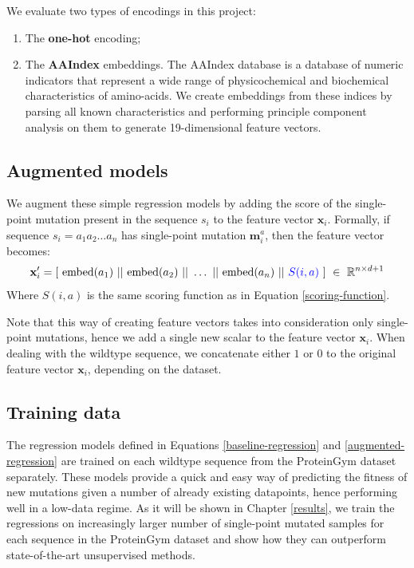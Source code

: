 We evaluate two types of encodings in this project:
\begin{enumerate}
    \item The \textbf{one-hot} encoding;
    \item The \textbf{AAIndex} embeddings. The AAIndex database \cite{aa-index} is a database of numeric indicators that represent a wide range of physicochemical and biochemical characteristics of amino-acids. We create embeddings from these indices by parsing all known characteristics and performing principle component analysis on them to generate 19-dimensional feature vectors. 
\end{enumerate}

\subsection{Augmented models} 
We augment these simple regression models by adding the score of the single-point mutation present in the sequence $s_i$ to the feature vector $\mathbf{x}_i$. Formally, if sequence $s_i = a_1a_2\dots a_n$ has single-point mutation $\mathbf{m}_i^a$, then the feature vector becomes:
\begin{equation}
    \mathbf{x}_i' = [~\text{embed}(a_1) ~||~ \text{embed}(a_2) ~||~ \dots ~||~ \text{embed}(a_n) ~||~ {\color{blue} S(i, a)}~] ~\in~\mathbb{R}^{n\times d + 1}
\label{augmented-regression}
\end{equation}
Where $S(i, a)$ is the same scoring function as in Equation \ref{scoring-function}. 

Note that this way of creating feature vectors takes into consideration only single-point mutations, hence we add a single new scalar to the feature vector $\mathbf{x}_i$. When dealing with the wildtype sequence, we concatenate either $1$ or $0$ to the original feature vector $\mathbf{x}_i$, depending on the dataset.

\subsection{Training data}
The regression models defined in Equations \ref{baseline-regression} and \ref{augmented-regression} are trained on each wildtype sequence from the ProteinGym dataset separately. These models provide a quick and easy way of predicting the fitness of new mutations given a number of already existing datapoints, hence performing well in a low-data regime. As it will be shown in Chapter \ref{results}, we train the regressions on increasingly larger number of single-point mutated samples for each sequence in the ProteinGym dataset and show how they can outperform state-of-the-art unsupervised methods.  
